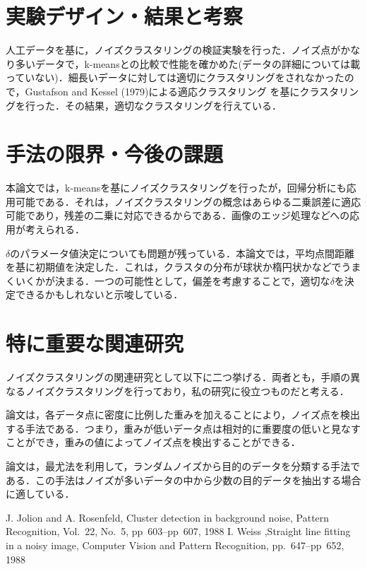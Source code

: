 \documentclass[10pt,onecolumn]{jsarticle}
\begin{document}
\section{実験デザイン・結果と考察}
人工データを基に，ノイズクラスタリングの検証実験を行った．ノイズ点がかなり多いデータで，k-meansとの比較で性能を確かめた(データの詳細については載っていない)．細長いデータに対しては適切にクラスタリングをされなかったので，Gustafson and Kessel (1979)による適応クラスタリング
を基にクラスタリングを行った．その結果，適切なクラスタリングを行えている．
\section{手法の限界・今後の課題}
本論文では，k-meansを基にノイズクラスタリングを行ったが，回帰分析にも応用可能である．それは，ノイズクラスタリングの概念はあらゆる二乗誤差に適応可能であり，残差の二乗に対応できるからである．画像のエッジ処理などへの応用が考えられる．

$\delta$のパラメータ値決定についても問題が残っている．本論文では，平均点間距離を基に初期値を決定した．これは，クラスタの分布が球状か楕円状かなどでうまくいくかが決まる．一つの可能性として，偏差を考慮することで，適切な$\delta$を決定できるかもしれないと示唆している．

\section{特に重要な関連研究}
ノイズクラスタリングの関連研究として以下に二つ挙げる．両者とも，手順の異なるノイズクラスタリングを行っており，私の研究に役立つものだと考える．

論文\cite{ref1}は，各データ点に密度に比例した重みを加えることにより，ノイズ点を検出する手法である．つまり，重みが低いデータ点は相対的に重要度の低いと見なすことができ，重みの値によってノイズ点を検出することができる．

論文\cite{ref2}は，最尤法を利用して，ランダムノイズから目的のデータを分類する手法である．この手法はノイズが多いデータの中から少数の目的データを抽出する場合に適している．


\begin{thebibliography}{99}
%
	J. Jolion and A. Rosenfeld,
	Cluster detection in background noise,
	Pattern Recognition, Vol.~22, No.~5, pp~603--pp~607, 1988
	I. Weiss ,Straight line fitting in a noisy image, Computer Vision and Pattern Recognition, pp.~647--pp~652, 1988

%
\end{thebibliography}



\end{document}
